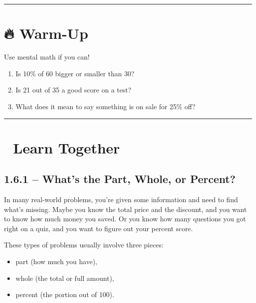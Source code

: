 \documentclass[
  letterpaper,
  DIV=11,
  numbers=noendperiod]{scrreprt}
\begin{document}
\begin{center}\rule{0.5\linewidth}{0.5pt}\end{center}

\section*{🔥 Warm-Up}\label{warm-up-5}


Use mental math if you can!

\begin{enumerate}
\def\labelenumi{\arabic{enumi}.}
\item
  Is 10\% of 60 bigger or smaller than 30?
\item
  Is 21 out of 35 a good score on a test?
\item
  What does it mean to say something is on sale for 25\% off?
\end{enumerate}

\begin{center}\rule{0.5\linewidth}{0.5pt}\end{center}

\section*{👥 Learn Together}\label{learn-together-5}


\subsection*{1.6.1 -- What's the Part, Whole, or
Percent?}\label{whats-the-part-whole-or-percent}

In many real-world problems, you're given some information and need to
find what's missing. Maybe you know the total price and the discount,
and you want to know how much money you saved. Or you know how many
questions you got right on a quiz, and you want to figure out your
percent score.

These types of problems usually involve three pieces:

\begin{itemize}
\item
  part (how much you have),
\item
  whole (the total or full amount),
\item
  percent (the portion out of 100).
\end{itemize}
\end{document}
